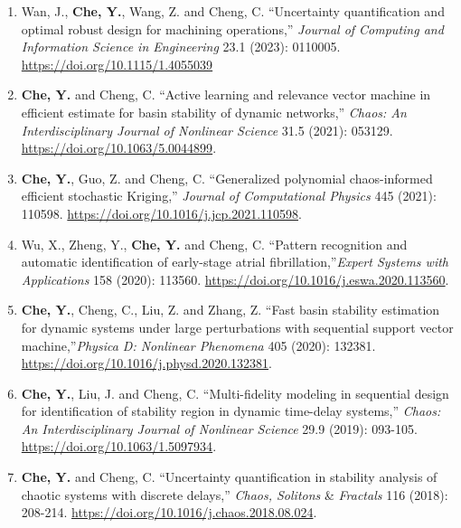 \documentclass[10pt]{article}
\begin{document}
\begin{enumerate}
	\item Wan, J., {\bf Che, Y.}, Wang, Z. and Cheng, C. ``Uncertainty quantification and optimal robust design for machining operations,'' \textit{Journal of Computing and Information Science in Engineering} 23.1 (2023): 0110005. \url{https://doi.org/10.1115/1.4055039}

	\item {\bf Che, Y.} and Cheng, C. ``Active learning and relevance vector machine in efficient estimate for basin stability of dynamic networks,'' \textit{Chaos: An Interdisciplinary Journal of Nonlinear Science} 31.5 (2021): 053129. \url{https://doi.org/10.1063/5.0044899}.

	\item {\bf Che, Y.}, Guo, Z. and Cheng, C. ``Generalized polynomial chaos-informed efficient stochastic Kriging,'' \textit{Journal of Computational Physics} 445 (2021): 110598. \url{https://doi.org/10.1016/j.jcp.2021.110598}.

	\item Wu, X., Zheng, Y., {\bf Che, Y.} and Cheng, C. ``Pattern recognition and automatic identification of early-stage atrial fibrillation,''\textit{Expert Systems with Applications} 158 (2020): 113560. \url{https://doi.org/10.1016/j.eswa.2020.113560}.

	\item {\bf Che, Y.}, Cheng, C., Liu, Z. and Zhang, Z. ``Fast basin stability estimation for dynamic systems under large perturbations with sequential support vector machine,''\textit{Physica D: Nonlinear Phenomena} 405 (2020): 132381. \url{https://doi.org/10.1016/j.physd.2020.132381}.

	\item {\bf Che, Y.}, Liu, J.  and Cheng, C. ``Multi-fidelity modeling in sequential design for identification of stability region in dynamic time-delay systems,''  \textit{Chaos: An Interdisciplinary Journal of Nonlinear Science} 29.9 (2019): 093-105. \url{https://doi.org/10.1063/1.5097934}.

	\item {\bf Che, Y.} and Cheng, C. ``Uncertainty quantification in stability analysis of chaotic systems with discrete delays,'' \textit{Chaos, Solitons} \& \textit{Fractals} 116 (2018): 208-214. \url{https://doi.org/10.1016/j.chaos.2018.08.024}.
\end{enumerate}
\end{document}
